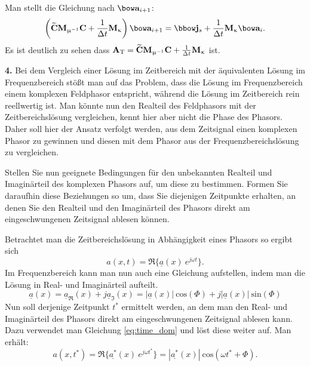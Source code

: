 \documentclass[Protokollheft.tex]{subfiles}
\begin{document}
Man stellt die Gleichung nach $\afit_{i+1}$:
$$ \left(\curldfit\Mmui\curlfit+\frac{1}{\Delta t}\Mkap\right)\afit_{i+1}= \jfit_{\boldmath{s}}+\frac{1}{\Delta t}\Mkap\afit_i. $$
Es ist deutlich zu sehen dass $ \mathbf{A} _\text{T} =\widetilde{\mathbf{C}}\mathbf{M}_{\upmu^{-1}}\mathbf{C}+\frac{1}{\Delta t}\mathbf{M}_{\upkappa} $ ist.



\begin{framed}
	\noindent \textbf{4.}\label{3}
      Bei dem Vergleich einer Lösung im Zeitbereich mit der äquivalenten Lösung im Frequenzbereich stößt man auf das Problem, dass die Lösung im 
      Frequenzbereich einem komplexen Feldphasor entspricht, während die Lösung im Zeitbereich rein reellwertig ist. Man könnte nun den Realteil 
      des Feldphasors mit der Zeitbereichslösung vergleichen, kennt hier aber nicht die Phase des Phasors. Daher soll hier der Ansatz verfolgt werden, 
      aus dem Zeitsignal einen komplexen Phasor zu gewinnen und diesen mit dem Phasor aus der Frequenzbereichslösung zu vergleichen.
      
Stellen Sie nun geeignete Bedingungen für den unbekannten Realteil und Imaginärteil des komplexen Phasors auf, um diese zu bestimmen. Formen Sie daraufhin diese Beziehungen so um, dass Sie diejenigen Zeitpunkte erhalten, an denen Sie den Realteil und den Imaginärteil des Phasors direkt am eingeschwungenen Zeitsignal ablesen können.\label{exer:calcTimes4RealImag}
\end{framed}
\noindent
Betrachtet man die Zeitbereichslösung in Abhängigkeit eines Phasors so ergibt sich 
\begin{equation}
a(x,t)=\Re\{\underline{a}(x)\ e^{j\omega t}\}.
\label{eq:time_dom}
\end{equation}
Im Frequenzbereich kann man nun auch eine Gleichung aufstellen, indem man die Lösung in Real- und Imaginärteil aufteilt.
\begin{equation}
\underline{a}(x)=\underline{a}_{\Re}(x) +j\underline{a}_{\Im}(x)=|\underline{a}(x)|\ \text{cos}(\Phi)+j|\underline{a}(x)|\ \text{sin}(\Phi)
\label{eq:freq_dom}
\end{equation}
Nun soll derjenige Zeitpunkt $t^*$ ermittelt werden, an dem man den Real- und Imaginärteil des Phasors direkt am eingeschwungenen Zeitsignal ablesen kann.
Dazu verwendet man Gleichung \ref{eq:time_dom} und löst diese weiter auf. Man erhält:
\begin{equation}
a(x,t^*)=\Re\{\underline{a^*}(x)\ e^{j\omega t^*}\}=|\underline{a^*}(x)|\ \text{cos}(\omega t^*+\Phi).
\label{eq:time_dom_2}
\end{equation}
\end{document}
